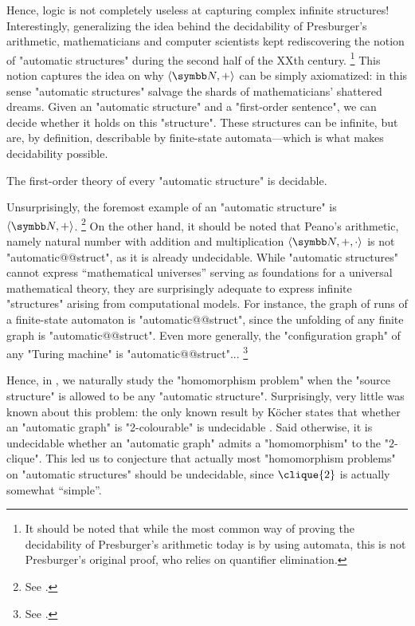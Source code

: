 Hence, logic is not completely useless at capturing complex infinite structures!
Interestingly, generalizing the idea behind the decidability of Presburger's arithmetic,
mathematicians and computer scientists kept 
rediscovering the notion of "automatic structures" during the second half
of the XXth century.%
\footnote{It should be noted that while the most common way of proving
the decidability of Presburger's arithmetic today is by using
automata, this is not Presburger's original proof, who relies on quantifier elimination.}
This notion captures the idea on why $\tup{\N,+}$ can be simply axiomatized:
in this sense "automatic structures" salvage the shards of mathematicians' shattered dreams.
Given an "automatic structure" and a "first-order sentence",
we can decide whether it holds on this "structure". These structures can be infinite,
but are, by definition, describable by finite-state automata---which is what
makes decidability possible.

\begin{known}
	The first-order theory of every "automatic structure" is decidable.
\end{known}

Unsurprisingly, the foremost example of an "automatic structure" is $\tup{\N, +}$.%
\footnote{See .}
On the other hand, it should be noted that Peano's arithmetic, namely natural number with
addition and multiplication $\tup{\N,+,\cdot}$ is not "automatic@@struct",
as it is already undecidable.
While "automatic structures" cannot express ``mathematical universes'' serving as
foundations for a universal mathematical theory, they are surprisingly adequate to
express infinite "structures" arising from computational models.
For instance, the graph of runs of a finite-state automaton is "automatic@@struct",
since the unfolding of any finite graph is "automatic@@struct".
Even more generally, the "configuration graph" of any "Turing machine" is "automatic@@struct"...%
\footnote{See .}

Hence, in , we naturally study the "homomorphism problem" when the "source structure"
is allowed to be any "automatic structure". Surprisingly, very little was known about this problem:
the only known result by Köcher states that whether an "automatic graph" is "2-colourable" is undecidable \cite{Kocher2014AutomatischenGraphen}.
Said otherwise, it is undecidable whether an "automatic graph" admits
a "homomorphism" to the "$2$-clique".
This led us to conjecture that actually most "homomorphism problems" on "automatic structures"
should be undecidable, since $\clique{2}$ is actually somewhat ``simple''.

